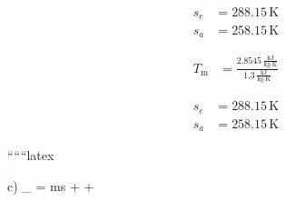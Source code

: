 \begin{align*}
s_e &= 288.15 \, \text{K} \\
s_a &= 258.15 \, \text{K}
\end{align*}

\begin{align*}
T_{\text{m}} &= \frac{2.8545 \, \frac{\text{kJ}}{\text{kg} \cdot \text{K}}}{1.3 \, \frac{\text{kJ}}{\text{kg} \cdot \text{K}}}
\end{align*}

\begin{align*}
s_e &= 288.15 \, \text{K} \\
s_a &= 258.15 \, \text{K}
\end{align*}

``````latex

c) \quad {}_{} \quad {}  = \sum ms +  + 

